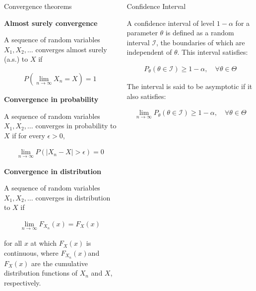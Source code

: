 \documentclass{beamer}
\begin{document}
\begin{frame}
\begin{columns}
\begin{column}{0.3\textwidth}
\begin{block}{Convergence theorems}

\textbf{Almost surely convergence}

A sequence of random variables $X_1, X_2, \ldots$ converges almost surely (a.s.) to $X$ if 

\begin{align*}
  P\left( \lim_{n \to \infty} X_n = X \right) = 1  
\end{align*}

\textbf{Convergence in probability}

A sequence of random variables $X_1, X_2, \ldots$ converges in probability to \(X\) if for every $\epsilon > 0$,

\begin{align*}
   \lim_{n \to \infty} P(|X_n - X| > \epsilon) = 0 
\end{align*}

\textbf{Convergence in distribution}

A sequence of random variables $X_1, X_2, \ldots$ converges in distribution to $X$ if 

\begin{align*}
    \lim_{n \to \infty} F_{X_n}(x) = F_X(x)
\end{align*}

for all $x$ at which \(F_X(x)\) is continuous, where $F_{X_n}(x)$and $F_X(x)$ are the cumulative distribution functions of $X_n$ and $X$, respectively.

\end{block}

\end{column}

\begin{column}{0.3\textwidth}

\begin{block}{Confidence Interval}

A confidence interval of level \(1-\alpha\) for a parameter \(\theta\) is defined as a random interval \(\mathcal{I}\), the boundaries of which are independent of \(\theta\). This interval satisfies:

\begin{align*}
    P_\theta\left(\theta \in \mathcal{I}\right) \geq 1 - \alpha, \quad \forall \theta \in \Theta
\end{align*}

The interval is said to be asymptotic if it also satisfies:

\begin{align*}
    \lim_{n \to \infty} P_\theta\left(\theta \in \mathcal{I}\right) \geq 1 - \alpha, \quad \forall \theta \in \Theta
\end{align*}


\end{block}
\end{column}
\end{columns}
\end{frame}
\end{document}
